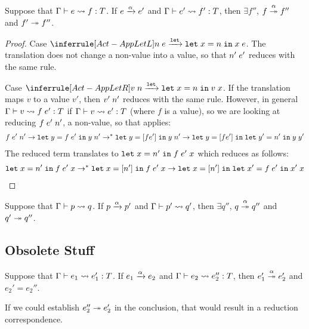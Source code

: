 \begin{conjecture}
  Suppose that $\translation {e}{f}T$.
  If $\reduce[\alpha]{e}{e'}$
  and $\translation{e'}{f'}T$,
  then $\exists f''$,  $\reducemany[\alpha]{f}{f''}$
  and $ \reducemany{f'}{f''}$.
\end{conjecture}
\begin{proof}
  Case $\RuleActAppLetL$.
  The translation does not change a non-value into a value, so that
  $\EApp{n'}{e'}$ reduces with the same rule.

  Case $\RuleActAppLetR$. If the translation maps $v$ to a value $v'$,
  then $\EApp{v'}{n'}$ reduces with the same rule.
  However, in general $\translation{v}{\EApp f{e'}}{T}$ if
  $\translation{v}{e'}T$ (where $f$ is a value), so we are looking at reducing $\EApp{\EApp
    f{e'}}{n'}$, a non-value, so that \textsc{\ActAppLetL} applies:
  \begin{gather*}
    \EApp{\EApp f{e'}}{n'}
    \to \ELet y{\EApp f{e'}}{\EApp y{n'}}
    \to^* \ELet y{[f{e'}]}{\EApp y{n'}}
    \to \ELet y{[f{e'}]}{\ELet {y'}{n'}\EApp y{y'}}
  \end{gather*}
  The reduced term translates to $\ELet x {n'} \EApp {\EApp f{e'}} x$
  which reduces as follows:
  \begin{gather*}
    \ELet x {n'} \EApp {\EApp f{e'}} x
    \to^* \ELet x {[n']} \EApp {\EApp f{e'}} x
    \to \ELet x {[n']} \ELet{x'}{\EApp f{e'}}\EApp {x'}x 
  \end{gather*}
\end{proof}

\begin{conjecture}
  Suppose that $\Ptranslation {p}{q}$.
  If $\reduce[\alpha]{p}{p'}$
  and $\Ptranslation{p'}{q'}$,
  then $\exists q''$,  $\reducemany[\alpha]{q}{q''}$
  and $ \reducemany{q'}{ q''}$.
\end{conjecture}


\subsection{Obsolete Stuff}
\label{sec:obsolete-stuff}



\begin{conjecture}[obsolete]
  Suppose that $\translation {e_1}{e_1'} T$.
  If $\reduce[\alpha]{e_1}{e_2}$
  and $\translation{e_2}{e_2''}{T}$,
  then $\reducemany[\alpha]{e_1'}{e_2'}$
  and $e_2' = e_2''$.
\end{conjecture}
If we could establish $\reducemany{e_2''}{e_2'}$ in  the
conclusion, that would result in a reduction correspondence.

